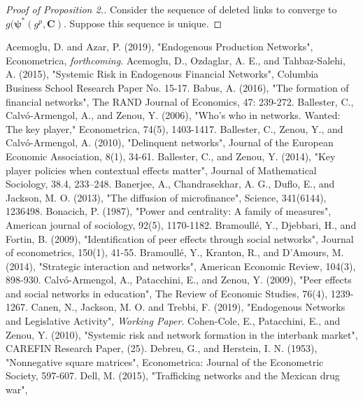\documentclass[12pt]{article}
\theoremstyle{definition}
\begin{document}
\begin{proof}[Proof of Proposition 2.]
	Consider the sequence of deleted links to converge to $g(\bm{\psi}^*(g^p, \bm{C})$.
	Suppose this sequence is unique.
\end{proof}


\begin{thebibliography}{99}
	Acemoglu, D. and Azar, P. (2019),
	"Endogenous Production Networks",
	Econometrica, \textit{forthcoming}.
	Acemoglu, D., Ozdaglar, A. E., and Tahbaz-Salehi, A. (2015),
	"Systemic Risk in Endogenous Financial Networks",
	Columbia Business School Research Paper No. 15-17.
	Babus, A. (2016),
	"The formation of financial networks",
	The RAND Journal of Economics, 47: 239-272.
	Ballester, C., Calv\'{o}‐Armengol, A., and Zenou, Y. (2006),
	"Who's who in networks. Wanted: The key player,"
	Econometrica, 74(5), 1403-1417.
	Ballester, C., Zenou, Y., and Calv\'{o}-Armengol, A. (2010),
	"Delinquent networks",
	Journal of the European Economic Association, 8(1), 34-61.
	Ballester, C., and Zenou, Y. (2014),
	"Key player policies when contextual effects matter",
	Journal of Mathematical Sociology, 38.4, 233–248.
	Banerjee, A., Chandrasekhar, A. G., Duflo, E., and Jackson, M. O. (2013),
	"The diffusion of microfinance",
	Science, 341(6144), 1236498.
	Bonacich, P. (1987),
	"Power and centrality: A family of measures",
	American journal of sociology, 92(5), 1170-1182.
	Bramoull\'{e}, Y., Djebbari, H., and Fortin, B. (2009),
	"Identification of peer effects through social networks",
	Journal of econometrics, 150(1), 41-55.
	Bramoull\'{e}, Y., Kranton, R., and D'Amours, M. (2014),
	"Strategic interaction and networks",
	American Economic Review, 104(3), 898-930.
	Calv\'{o}-Armengol, A., Patacchini, E., and Zenou, Y. (2009),
	"Peer effects and social networks in education",
	The Review of Economic Studies, 76(4), 1239-1267.
	Canen, N., Jackson, M. O. and Trebbi, F. (2019),
	"Endogenous Networks and Legislative Activity",
	\textit{Working Paper}.
	Cohen-Cole, E., Patacchini, E., and Zenou, Y. (2010),
	"Systemic risk and network formation in the interbank market",
	CAREFIN Research Paper, (25).
	Debreu, G., and Herstein, I. N. (1953),
	"Nonnegative square matrices",
	Econometrica: Journal of the Econometric Society, 597-607.
	Dell, M. (2015),
	"Trafficking networks and the Mexican drug war",

\end{thebibliography}
\end{document}
